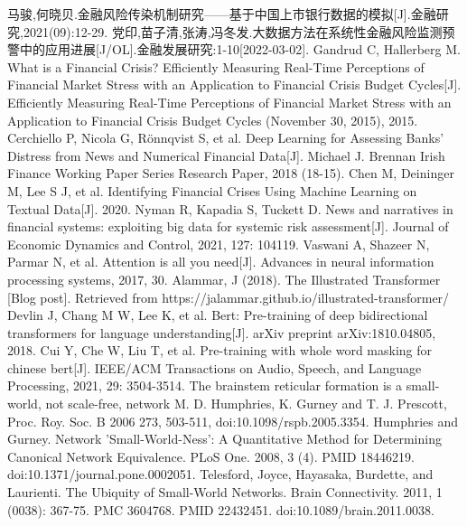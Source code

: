 \documentclass[lang=cn]{elegantpaper}
\begin{document}
\begin{thebibliography}{99}
    马骏,何晓贝.金融风险传染机制研究——基于中国上市银行数据的模拟[J].金融研究,2021(09):12-29.
    党印,苗子清,张涛,冯冬发.大数据方法在系统性金融风险监测预警中的应用进展[J/OL].金融发展研究:1-10[2022-03-02].
    Gandrud C, Hallerberg M. What is a Financial Crisis? Efficiently Measuring Real-Time Perceptions of Financial Market Stress with an Application to Financial Crisis Budget Cycles[J]. Efficiently Measuring Real-Time Perceptions of Financial Market Stress with an Application to Financial Crisis Budget Cycles (November 30, 2015), 2015.
    Cerchiello P, Nicola G, Rönnqvist S, et al. Deep Learning for Assessing Banks' Distress from News and Numerical Financial Data[J]. Michael J. Brennan Irish Finance Working Paper Series Research Paper, 2018 (18-15).
    Chen M, Deininger M, Lee S J, et al. Identifying Financial Crises Using Machine Learning on Textual Data[J]. 2020.
    Nyman R, Kapadia S, Tuckett D. News and narratives in financial systems: exploiting big data for systemic risk assessment[J]. Journal of Economic Dynamics and Control, 2021, 127: 104119.
    Vaswani A, Shazeer N, Parmar N, et al. Attention is all you need[J]. Advances in neural information processing systems, 2017, 30.
    Alammar, J (2018). The Illustrated Transformer [Blog post]. Retrieved from https://jalammar.github.io/illustrated-transformer/
    Devlin J, Chang M W, Lee K, et al. Bert: Pre-training of deep bidirectional transformers for language understanding[J]. arXiv preprint arXiv:1810.04805, 2018.
    Cui Y, Che W, Liu T, et al. Pre-training with whole word masking for chinese bert[J]. IEEE/ACM Transactions on Audio, Speech, and Language Processing, 2021, 29: 3504-3514.
    The brainstem reticular formation is a small-world, not scale-free, network M. D. Humphries, K. Gurney and T. J. Prescott, Proc. Roy. Soc. B 2006 273, 503-511, doi:10.1098/rspb.2005.3354.
    Humphries and Gurney. Network 'Small-World-Ness': A Quantitative Method for Determining Canonical Network Equivalence. PLoS One. 2008, 3 (4). PMID 18446219. doi:10.1371/journal.pone.0002051.
    Telesford, Joyce, Hayasaka, Burdette, and Laurienti. The Ubiquity of Small-World Networks. Brain Connectivity. 2011, 1 (0038): 367-75. PMC 3604768. PMID 22432451. doi:10.1089/brain.2011.0038.
\end{thebibliography}
\end{document}
